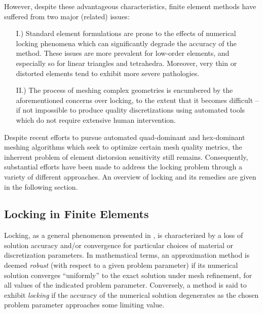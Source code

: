 	However, despite these advantageous characteristics, finite element methods have suffered from two major (related) issues:
	\begin{itemize}
		\item[I.)] Standard element formulations are prone to the effects of numerical locking phenomena which can significantly degrade the accuracy of the method. These issues are more prevalent for low-order elements, and especially so for linear triangles and tetrahedra. Moreover, very thin or distorted elements tend to exhibit more severe pathologies.
		\item[II.)] The process of meshing complex geometries is encumbered by the aforementioned concerns over locking, to the extent that it becomes difficult -- if not impossible to produce quality discretizations using automated tools which do not require extensive human intervention.
	\end{itemize}
	
	Despite recent efforts to pursue automated quad-dominant \cite{Remacle:12} and hex-dominant \cite{Xifeng:17} meshing algorithms which seek to optimize certain mesh quality metrics, the inherrent problem of element distorsion sensitivity still remains. Consequently, substantial efforts have been made to address the locking problem through a variety of different approaches. An overview of locking and its remedies are given in the following section.

	\subsection*{Locking in Finite Elements}
	
		Locking, as a general phenomenon presented in \cite{Babuska&Suri:92:1}, is characterized by a loss of solution accuracy and/or convergence for particular choices of material or discretization parameters. In mathematical terms, an approximation method is deemed \textit{robust} (with respect to a given problem parameter) if its numerical solution converges ``uniformly'' to the exact solution under mesh refinement, for all values of the indicated problem parameter. Conversely, a method is said to exhibit \textit{locking} if the accuracy of the numerical solution degenerates as the chosen problem parameter approaches some limiting value.
		
